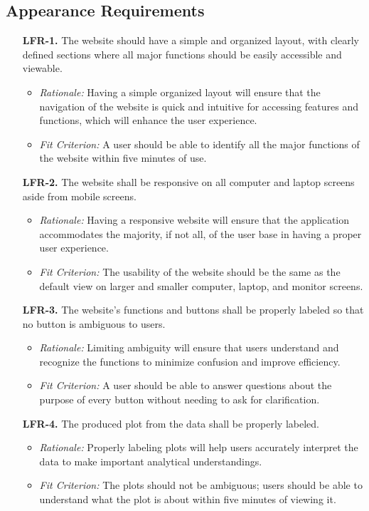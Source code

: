 \documentclass[12pt]{article}
\begin{document}
\subsection{Appearance Requirements}
\begin{enumerate}
  \item[\textbf{LFR-1.}] The website should have a simple and organized layout, with
  clearly defined sections where all major functions should be easily accessible
  and viewable.
  \begin{itemize}
    \item \textit{Rationale:} Having a simple organized layout will ensure that the
    navigation of the website is quick and intuitive for accessing features and
    functions, which will enhance the user experience.
    \item \textit{Fit Criterion:} A user should be able to identify all the major
    functions of the website within five minutes of use.
  \end{itemize}
  
  \item[\textbf{LFR-2.}] The website shall be responsive on all computer and laptop screens
  aside from mobile screens.
  \begin{itemize}
    \item \textit{Rationale:} Having a responsive website will ensure that the
    application accommodates the majority, if not all, of the user base in having a
    proper user experience. 
    \item \textit{Fit Criterion:} The usability of the website should be the same
    as the default view on larger and smaller computer, laptop, and monitor screens.
  \end{itemize}
  
  \item[\textbf{LFR-3.}] The website's functions and buttons shall be properly labeled
  so that no button is ambiguous to users.
  \begin{itemize}
    \item \textit{Rationale:} Limiting ambiguity will ensure that users
    understand and recognize the functions to minimize confusion and improve
    efficiency.
    \item \textit{Fit Criterion:} A user should be able to answer questions
    about the purpose of every button without needing to ask for clarification.
  \end{itemize}
  
  \item[\textbf{LFR-4.}] The produced plot from the data shall be properly labeled.
  \begin{itemize}
    \item \textit{Rationale:} Properly labeling plots will help users
    accurately interpret the data to make important analytical understandings.
    \item \textit{Fit Criterion:} The plots should not be ambiguous; users
    should be able to understand what the plot is about within five minutes of
    viewing it.
  \end{itemize}
\end{enumerate}
\end{document}
